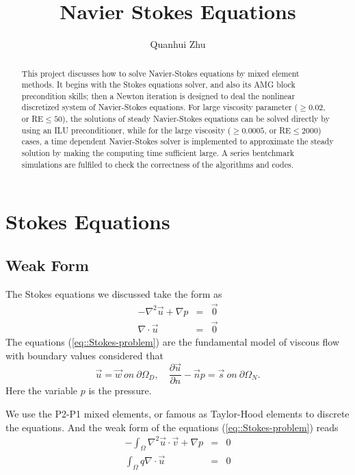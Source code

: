 \documentclass[a4paper]{article}
\title{Navier Stokes Equations}
\author{Quanhui Zhu}
\begin{document}
\maketitle

\begin{abstract}
  This project discusses how to solve Navier-Stokes equations by mixed
  element methods. It begins with the Stokes equations solver, and
  also its AMG block precondition skills; then a Newton iteration is
  designed to deal the nonlinear discretized system of Navier-Stokes
  equations.  For large viscosity parameter ($\geq 0.02$, or RE$\leq
  50$), the solutions of steady Navier-Stokes equations can be solved
  directly by using an ILU preconditioner, while for the large
  viscosity ($\geq 0.0005$, or RE$\leq 2000$) cases, a time dependent
  Navier-Stokes solver is implemented to approximate the steady
  solution by making the computing time sufficient large. A series
  bentchmark simulations are fulfiled to check the correctness of the
  algorithms and codes.
\end{abstract}


\section{Stokes Equations}

\subsection{Weak Form}

The Stokes equations we discussed take the form as
\begin{equation}
\begin{array}{rcl}
-\nabla^2 \vec{u} + \nabla p &=& \vec{0} \\
\nabla \cdot \vec{u} &=& \vec{0}
\label{eq::Stokes-problem}
\end{array}
\end{equation}
The equations (\ref{eq::Stokes-problem}) are the fundamental model of
viscous flow with boundary values considered that
\begin{equation}
\vec{u} = \vec{w} \ on \ \partial \Omega_D ,\quad \frac{\partial
  \vec{u}}{\partial n} - \vec{n} p = \vec{s} \ on \ \partial \Omega_N.
\end{equation}
Here the variable $p$ is the pressure.

We use the P2-P1 mixed elements, or famous as Taylor-Hood elements
\cite{Lee2005Finite} to discrete the equations. And the weak form of
the equations (\ref{eq::Stokes-problem}) reads
\begin{equation}
\begin{array}{rcl}
-\int_\Omega \nabla^2 \vec{u} \cdot \vec{v} + \nabla p &=& 0\\
\int_\Omega q\nabla \cdot \vec{u} &=&0
\label{eq::Stokes-weakform}
\end{array}
\end{equation}
\end{document}
